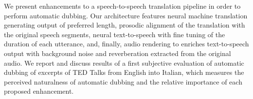 We present enhancements to a  speech-to-speech translation pipeline in order to perform automatic dubbing. Our architecture features neural machine translation generating output of preferred length, prosodic alignment of the translation with the original speech segments, neural text-to-speech with fine tuning of the duration of each utterance, and, finally, audio rendering to enriches text-to-speech output with background noise and reverberation extracted from the original audio. We report and discuss results of a first subjective evaluation of automatic dubbing of excerpts of TED Talks from English into Italian, which measures the perceived naturalness  of automatic dubbing and the relative importance of each proposed enhancement.

